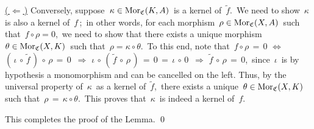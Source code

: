 \vskip 0.4cm
\noindent
\underline{(\,$\Longleftarrow$\,)}\;\;
Conversely, suppose \,$\kappa \in \textnormal{Mor}_{\mathfrak{C}}(K,A)$\, is a kernel of \,$\widetilde{f}$.\,
We need to show \,$\kappa$\, is also a kernel of \,$f$\,;\,
in other words, for each morphism \,$\rho \in \textnormal{Mor}_{\mathfrak{C}}(X,A)$\, such that \,$f \circ \rho = 0$,\,
we need to show that there exists a unique morphism \,$\theta \in \textnormal{Mor}_{\mathfrak{C}}(X,K)$\,
such that \,$\rho = \kappa \circ \theta$.\,
To this end, note that
\,$f \circ \rho \,=\, 0$
\;\;$\Longleftrightarrow$\;\; $(\,\iota \,\circ\, \widetilde{f} \,) \,\circ\, \rho \,=\, 0$\,
\;\;$\Longrightarrow$\;\; $\iota \,\circ\, (\,\widetilde{f} \,\circ\, \rho\,) \,=\, 0 \,=\, \iota \,\circ\, 0$\,
\;\;$\Longrightarrow$\;\; $\widetilde{f} \,\circ\, \rho \,=\, 0$,\,
since \,$\iota$\, is by hypothesis a monomorphism and can be cancelled on the left.
Thus, by the universal property of \,$\kappa$\, as a kernel of \,$\widetilde{f}$,\,
there exists a unique \,$\theta \in \textnormal{Mor}_{\mathfrak{C}}(X,K)$\,
such that \,$\rho \,=\, \kappa \circ \theta$.\,
This proves that \,$\kappa$\, is indeed a kernel of \,$f$.

\vskip 0.4cm
\noindent
This completes the proof of the Lemma.
\qed


